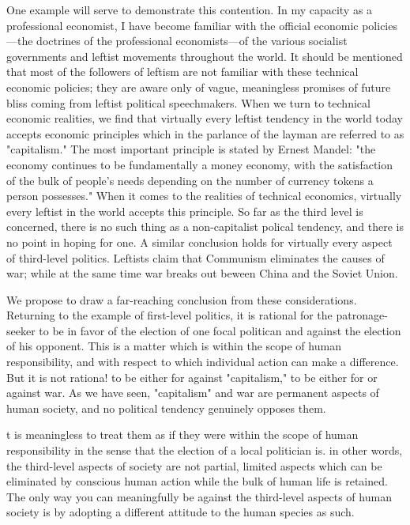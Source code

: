 \documentclass[10pt,twoside,draft]{memoir}
\begin{document}
{{{One example will serve to demonstrate this contention. In my capacity 
as a professional economist, I have become familiar with the official 
economic policies---the doctrines of the professional economists---of the 
various socialist governments and leftist movements throughout the world. It 
should be mentioned that most of the followers of leftism are not familiar 
with these technical economic policies; they are aware only of vague, 
meaningless promises of future bliss coming from leftist political 
speechmakers. When we turn to technical economic realities, we find that 
virtually every leftist tendency in the world today accepts economic 
principles which in the parlance of the layman are referred to as 
"capitalism." The most important principle is stated by Ernest Mandel: "the 
economy continues to be fundamentally a money economy, with the 
satisfaction of the bulk of people's needs depending on the number of 
currency tokens a person possesses." When it comes to the realities of 
technical economics, virtually every leftist in the world accepts this 
principle. So far as the third level is concerned, there is no such thing as a 
non-capitalist polical tendency, and there is no point in hoping for one. A 
similar conclusion holds for virtually every aspect of third-level politics. 
Leftists claim that Communism eliminates the causes of war; while at the 
same time war breaks out beween China and the Soviet Union. 

We propose to draw a far-reaching conclusion from these 
considerations. Returning to the example of first-level politics, it is rational 
for the patronage-seeker to be in favor of the election of one focal politican 
and against the election of his opponent. This is a matter which is within the 
scope of human responsibility, and with respect to which individual action 
can make a difference. But it is not rationa! to be either for against 
"capitalism," to be either for or against war. As we have seen, "capitalism" 
and war are permanent aspects of human society, and no political tendency 
genuinely opposes them. {t is meaningless to treat them as if they were 
within the scope of human responsibility in the sense that the election of a 
local politician is. in other words, the third-level aspects of society are not 
partial, limited aspects which can be eliminated by conscious human action 
while the bulk of human life is retained. The only way you can meaningfully 
be against the third-level aspects of human society is by adopting a different 
attitude to the human species as such. 

}}}}
\end{document}
